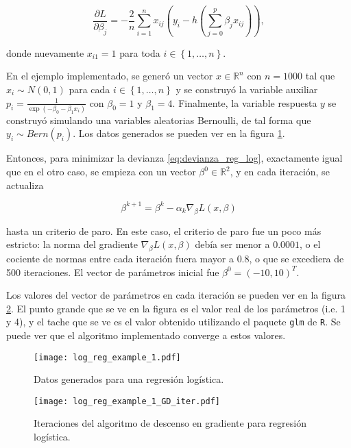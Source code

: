 $$
  \frac{\partial L}{\partial \beta_j} = -\frac{2}{n} \sum_{i = 1}^n { x_{ij}(y_i - h(\sum_{j=0}^{p}{\beta_j x_{ij}})) },
$$

donde nuevamente $x_{i1} = 1$ para toda $i \in \left\{1, \hdots, n \right\}$.


En el ejemplo implementado, se generó un vector $x \in \mathbb{R}^n$ con $n = 1000$ tal que $x_i \sim N(0, 1)$ para cada $i \in \left\{1, \hdots, n \right\}$ y se construyó la variable auxiliar $p_i = \frac{1}{\exp \left( - \beta_0 - \beta_1 x_i \right)}$ con $\beta_0 = 1$ y $\beta_1 = 4$. Finalmente, la variable respuesta $y$ se construyó simulando una variables aleatorias Bernoulli, de tal forma que $y_i \sim Bern(p_i)$. Los datos generados se pueden ver en la figura \ref{fig:reg_log_ejemplo}.

Entonces, para minimizar la devianza \ref{eq:devianza_reg_log}, exactamente igual que en el otro caso, se empieza con un vector $\beta^0 \in \mathbb{R}^2$, y en cada iteración, se actualiza 

$$
  \beta^{k+1} = \beta^k - \alpha_k \nabla_{\beta} L(x, \beta)
$$

hasta un criterio de paro. En este caso, el criterio de paro fue un poco más estricto: la norma del gradiente $\nabla_{\beta} L(x, \beta)$ debía ser menor a $0.0001$, o el cociente de normas entre cada iteración fuera mayor a $0.8$, o que se excediera de 500 iteraciones. El vector de parámetros inicial fue $\beta^0 = (-10, 10)^T$. 

Los valores del vector de parámetros en cada iteración se pueden ver en la figura \ref{fig:reg_log_ejemplo_GD_iter}. El punto grande que se ve en la figura es el valor real de los parámetros (i.e. 1 y 4), y el tache que se ve es el valor obtenido utilizando el paquete \texttt{glm} de \texttt{R}. Se puede ver que el algoritmo implementado converge a estos valores.


\begin{figure}[H]
  \centering
  \texttt{[image: log\_reg\_example\_1.pdf]}
  \caption{Datos generados para una regresión logística.}
  \label{fig:reg_log_ejemplo}
\end{figure}


\begin{figure}[H]
  \centering
  \texttt{[image: log\_reg\_example\_1\_GD\_iter.pdf]}
  \caption{Iteraciones del algoritmo de descenso en gradiente para regresión logística.}
  \label{fig:reg_log_ejemplo_GD_iter}
\end{figure}

